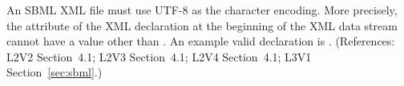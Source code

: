 An SBML XML file must use UTF-8 as the character encoding.  More
precisely, the  attribute of the XML declaration
at the beginning of the XML data stream cannot have a value other
than .  An example valid declaration is .  (References: L2V2
Section~4.1; L2V3 Section~4.1; L2V4 Section~4.1; L3V1 Section~\ref{sec:sbml}.)
